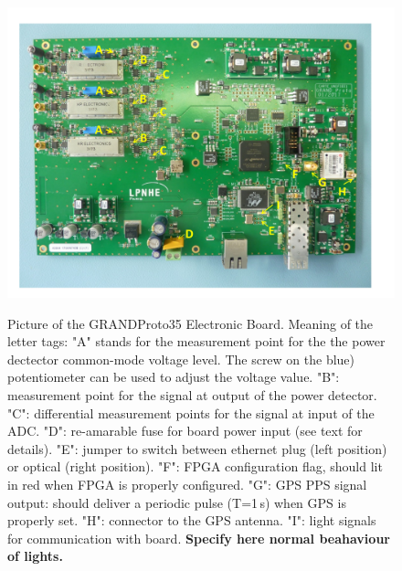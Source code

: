 \begin{figure}[t!]
\begin{center}
{
\includegraphics[width=\textwidth]{plots/GP35_FEU.pdf}  
}
\end{center}
\caption{Picture of the GRANDProto35 Electronic Board. Meaning of the letter tags: "A" stands for the measurement point for the the power dectector common-mode voltage level. The screw on the blue) potentiometer can be used to adjust the voltage value. "B": measurement point for the signal at output of the power detector. "C": differential measurement points for the signal at input of the ADC. "D": re-amarable fuse for board power input (see text for details). "E": jumper to switch between ethernet plug (left position) or optical (right position). "F": FPGA configuration flag, should lit in red when FPGA is properly configured. "G": GPS PPS signal output: should deliver a periodic pulse (T=1\,s) when GPS is properly set. "H": connector to the GPS antenna. "I": light signals for communication with board. {\bf Specify here normal beahaviour of lights.}  
}
\label{fig:board} 
\end{figure}


